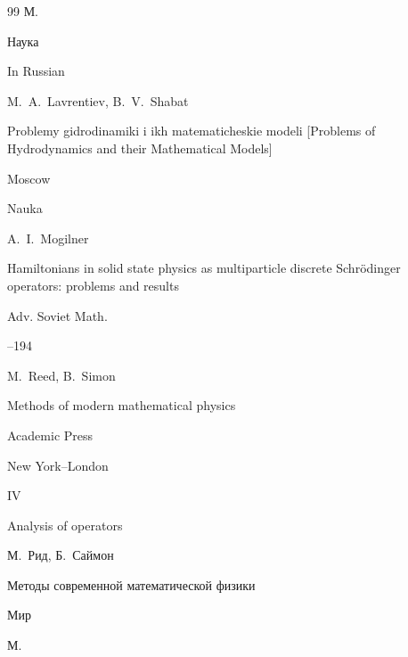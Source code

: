 \begin{thebibliography}{99}
\publaddr М.

\publ Наука 



\misctransl

\lang In Russian

\by M.~A.~Lavrentiev, B.~V.~Shabat

\book Problemy gidrodinamiki i ikh matematicheskie modeli \rm [Problems of Hydrodynamics and their Mathematical Models]

\publaddr Moscow

\publ Nauka








\by A.~I.~Mogilner 

\paper Hamiltonians in solid state physics as multiparticle discrete Schr\"{o}dinger operators: problems and results 

\jour Adv. Soviet Math.



--194




\by M.~Reed, B.~Simon

\book Methods of modern mathematical physics


\publ Academic Press

\publaddr New York--London

\bookvol IV

\voltitle Analysis of operators




\rtransl

\by М.~Рид, Б.~Саймон

\book Методы современной математической физики


\publ Мир

\publaddr М.



\end{thebibliography}
